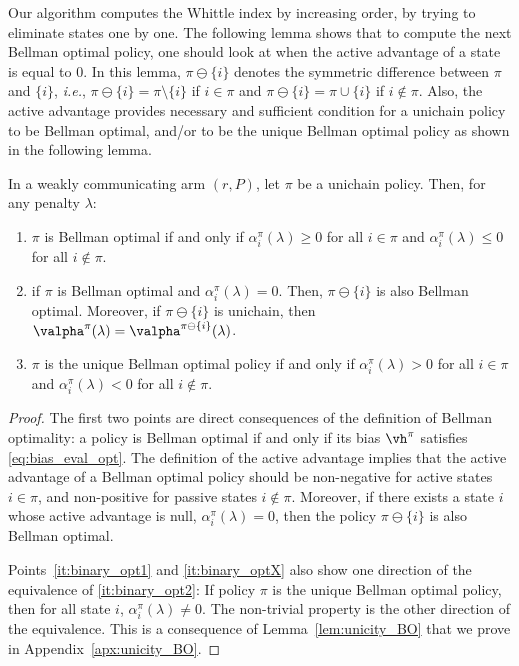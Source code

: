 Our algorithm computes the Whittle index by increasing order, by trying to eliminate states one by one.
The following lemma shows that to compute the next Bellman optimal policy, one should look at when the active advantage of a state is equal to $0$.
In this lemma, $\pi\ominus\{i\}$ denotes the symmetric difference between $\pi$ and $\{i\}$, \emph{i.e.}, $\pi\ominus\{i\}=\pi\setminus\{i\}$ if $i\in\pi$ and $\pi\ominus\{i\}=\pi\cup\{i\}$ if $i\not\in\pi$.
Also, the active advantage provides necessary and sufficient condition for a unichain policy to be Bellman optimal, and/or to be the unique Bellman optimal policy as shown in the following lemma.
\begin{lem}
    \label{lem:unicity_binary}
    In a weakly communicating arm $(r,P)$, let $\pi$ be a unichain policy. Then, for any penalty $\lambda$:
    \begin{enumerate}[label=(\roman*)]
        \item \label{it:binary_opt1} $\pi$ is Bellman optimal if and only if $\alpha^\pi_i(\lambda)\ge0$ for all $i\in\pi$ and $\alpha^\pi_i(\lambda)\le0$ for all $i\notin\pi$.
        \item \label{it:binary_optX} if $\pi$ is Bellman optimal and $\alpha^\pi_i(\lambda)=0$. Then, $\pi\ominus\{i\}$ is also Bellman optimal.  Moreover, if $\pi\ominus\{i\}$ is unichain, then $\valpha^\pi(\lambda)=\valpha^{\pi\ominus\{i\}}(\lambda)$.
        \item \label{it:binary_opt2} $\pi$ is the unique Bellman optimal policy if and only if $\alpha^\pi_i(\lambda)>0$ for all $i\in\pi$ and $\alpha^\pi_i(\lambda)<0$ for all $i\notin\pi$.
    \end{enumerate}
\end{lem}
\begin{proof}
    The first two points are direct consequences of the definition of Bellman optimality: a policy is Bellman optimal if and only if its bias $\vh^\pi$ satisfies \eqref{eq:bias_eval_opt}. The definition of the active advantage implies that the active advantage of a Bellman optimal policy should be non-negative for active states $i\in\pi$, and non-positive for passive states $i\not\in\pi$. Moreover, if there exists a state $i$ whose active advantage is null, $\alpha^\pi_i(\lambda)=0$, then the policy $\pi\ominus\{i\}$ is also Bellman optimal.  
    
    Points~\ref{it:binary_opt1} and \ref{it:binary_optX} also show one direction of the equivalence of \ref{it:binary_opt2}: If policy $\pi$ is the unique Bellman optimal policy, then for all state $i$, $\alpha^\pi_i(\lambda)\ne0$. The non-trivial property is the other direction of the equivalence. This is a consequence of Lemma~\ref{lem:unicity_BO} that we prove in Appendix~\ref{apx:unicity_BO}.
\end{proof}

